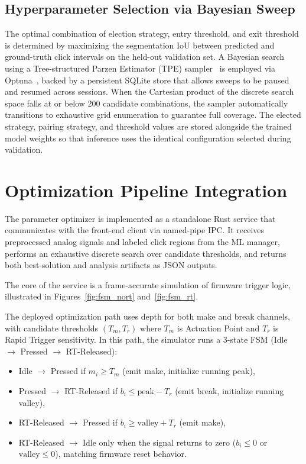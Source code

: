 \subsection{Hyperparameter Selection via Bayesian Sweep}
The optimal combination of election strategy, entry threshold, and exit threshold is determined by maximizing the segmentation IoU between predicted and ground-truth click intervals on the held-out validation set. A Bayesian search using a Tree-structured Parzen Estimator (TPE) sampler~\cite{bergstra_tpe_2011} is employed via Optuna~\cite{optuna_akiba_2019}, backed by a persistent SQLite store that allows sweeps to be paused and resumed across sessions. When the Cartesian product of the discrete search space falls at or below 200 candidate combinations, the sampler automatically transitions to exhaustive grid enumeration to guarantee full coverage. The elected strategy, pairing strategy, and threshold values are stored alongside the trained model weights so that inference uses the identical configuration selected during validation.

\section{Optimization Pipeline Integration}
\label{sec:optimizer_impl}

The parameter optimizer is implemented as a standalone Rust service that communicates with the front-end client via named-pipe IPC. It receives preprocessed analog signals and labeled click regions from the ML manager, performs an exhaustive discrete search over candidate thresholds, and returns both best-solution and analysis artifacts as JSON outputs.

The core of the service is a frame-accurate simulation of firmware trigger logic, illustrated in Figures~\ref{fig:fsm_nort} and~\ref{fig:fsm_rt}.





The deployed optimization path uses depth for both make and break channels, with candidate thresholds $(T_m, T_r)$ where $T_m$ is Actuation Point and $T_r$ is Rapid Trigger sensitivity. In this path, the simulator runs a 3-state FSM (Idle $\rightarrow$ Pressed $\rightarrow$ RT-Released):

\begin{itemize}
  \item Idle $\rightarrow$ Pressed if $m_i \ge T_m$ (emit make, initialize running peak),
  \item Pressed $\rightarrow$ RT-Released if $b_i \le \mathrm{peak} - T_r$ (emit break, initialize running valley),
  \item RT-Released $\rightarrow$ Pressed if $b_i \ge \mathrm{valley} + T_r$ (emit make),
  \item RT-Released $\rightarrow$ Idle only when the signal returns to zero ($b_i \le 0$ or $\mathrm{valley} \le 0$), matching firmware reset behavior.
\end{itemize}

